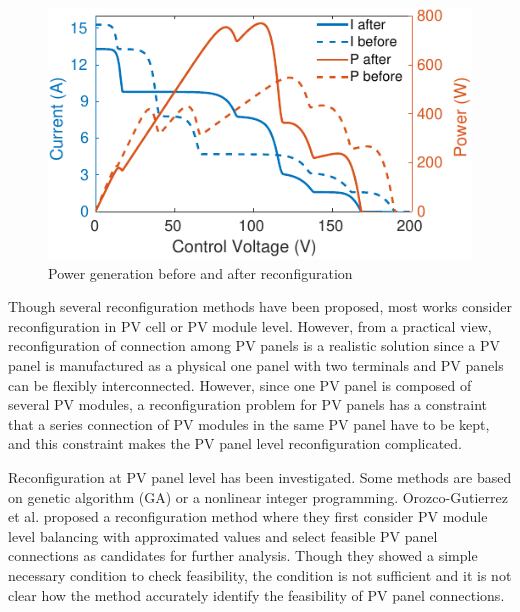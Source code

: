 \documentclass[conference]{IEEEtran}
\begin{document}
\begin{figure}
    \centering
    \includegraphics[width=0.7\linewidth]{fig/compare.png}
    \caption{Power generation before and after reconfiguration}
    \label{compare}
\end{figure}


Though several reconfiguration methods have been proposed, most works consider reconfiguration in PV cell or PV module level\cite{storey2014optimized,udenze2018reconfiguration}.
However, from a practical view, reconfiguration of connection among PV panels is a realistic solution since a PV panel is manufactured as a physical one panel with two terminals and PV panels can be flexibly interconnected. However, since one PV panel is composed of several PV modules, a reconfiguration problem for PV panels has a constraint that a series connection of PV modules in the same PV panel have to be kept, and 
this constraint makes the PV panel level reconfiguration complicated.



Reconfiguration at PV panel level has been investigated\cite{carotenuto2015evolutionary,hu2017non,orozco2016optimized}. 
Some methods are based on genetic algorithm (GA)\cite{carotenuto2015evolutionary} or a nonlinear integer programming\cite{hu2017non}.
Orozco-Gutierrez et al. proposed a reconfiguration method\cite{orozco2016optimized} where they first consider PV module level balancing with approximated values and select feasible PV panel connections as candidates for further analysis. 
Though they showed a simple necessary condition to check feasibility, the condition is not sufficient and it is not clear how the method accurately identify the feasibility of PV panel connections. 
\end{document}
